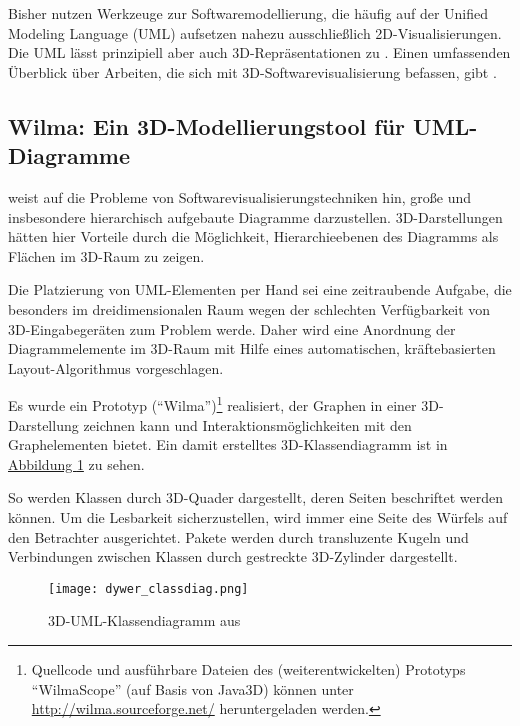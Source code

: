 \documentclass[a4paper,10pt]{sphinxmanual}
\begin{document}
Bisher nutzen Werkzeuge zur Softwaremodellierung, die häufig auf der Unified Modeling Language (UML) aufsetzen nahezu ausschließlich 2D-Visualisierungen.
Die UML lässt prinzipiell aber auch 3D-Repräsentationen zu \cite{booch_unified_1999}.
Einen umfassenden Überblick über Arbeiten, die sich mit 3D-Softwarevisualisierung befassen, gibt \cite{teyseyre_overview_2009}.


\subsection{Wilma: Ein 3D-Modellierungstool für UML-Diagramme}
\label{related:dywer}\label{related:wilma-ein-3d-modellierungstool-fur-uml-diagramme}
\cite{dwyer_three_2001} weist auf die Probleme von Softwarevisualisierungstechniken hin, große und insbesondere hierarchisch aufgebaute Diagramme darzustellen.
3D-Darstellungen hätten hier Vorteile durch die Möglichkeit, Hierarchieebenen des Diagramms als Flächen im 3D-Raum zu zeigen.

Die Platzierung von UML-Elementen per Hand sei eine zeitraubende Aufgabe, die besonders im dreidimensionalen Raum wegen der schlechten Verfügbarkeit von 3D-Eingabegeräten zum Problem werde.
Daher wird eine Anordnung der Diagrammelemente im 3D-Raum mit Hilfe eines automatischen, kräftebasierten Layout-Algorithmus vorgeschlagen.

Es wurde ein Prototyp ("`Wilma"')\footnote{
Quellcode und ausführbare Dateien des (weiterentwickelten) Prototyps "`WilmaScope"' (auf Basis von Java3D) können unter \href{http://wilma.sourceforge.net/}{http://wilma.sourceforge.net/} heruntergeladen werden.
} realisiert, der Graphen in einer 3D-Darstellung zeichnen kann und Interaktionsmöglichkeiten mit den Graphelementen bietet.
Ein damit erstelltes 3D-Klassendiagramm ist in \hyperref[related:dywer-classdiag]{Abbildung  \ref*{related:dywer-classdiag}} zu sehen.

So werden Klassen durch 3D-Quader dargestellt, deren Seiten beschriftet werden können.
Um die Lesbarkeit sicherzustellen, wird immer eine Seite des Würfels auf den Betrachter ausgerichtet.
Pakete werden durch transluzente Kugeln und Verbindungen zwischen Klassen durch gestreckte 3D-Zylinder dargestellt.
\begin{figure}[htbp]
\centering
\capstart

\texttt{[image: dywer\_classdiag.png]}
\caption{3D-UML-Klassendiagramm aus \cite{dwyer_three_2001}}\label{related:dywer-classdiag}\end{figure}
\end{document}
